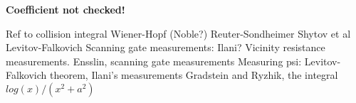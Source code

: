 \documentclass[preprint,aps,eqsecnum]{revtex4-1}
\begin{document}
\textbf{Coefficient not checked!}

\begin{thebibliography}{99}
 Ref to collision integral
 Wiener-Hopf (Noble?)
 Reuter-Sondheimer
 Shytov et al
 Levitov-Falkovich
 Scanning gate measurements: Ilani?
 Vicinity resistance measurements.
 Ensslin, scanning gate measurements
 Measuring psi: Levitov-Falkovich theorem,
  Ilani's measurements
 Gradstein and Ryzhik, the integral $log(x)/(x^2 + a^2)$
\end{thebibliography}
\end{document}
